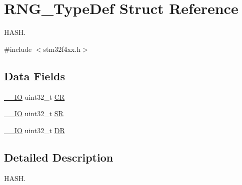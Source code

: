 \hypertarget{struct_r_n_g___type_def}{\section{R\-N\-G\-\_\-\-Type\-Def Struct Reference}
\label{struct_r_n_g___type_def}
}


H\-A\-S\-H.  




{\ttfamily \#include $<$stm32f4xx.\-h$>$}

\subsection*{Data Fields}
\begin{DoxyCompactItemize}
\item 
\hyperlink{group___c_m_s_i_s__core__definitions_gaec43007d9998a0a0e01faede4133d6be}{\-\_\-\-\_\-\-I\-O} uint32\-\_\-t \hyperlink{struct_r_n_g___type_def_ab40c89c59391aaa9d9a8ec011dd0907a}{C\-R}
\item 
\hyperlink{group___c_m_s_i_s__core__definitions_gaec43007d9998a0a0e01faede4133d6be}{\-\_\-\-\_\-\-I\-O} uint32\-\_\-t \hyperlink{struct_r_n_g___type_def_af6aca2bbd40c0fb6df7c3aebe224a360}{S\-R}
\item 
\hyperlink{group___c_m_s_i_s__core__definitions_gaec43007d9998a0a0e01faede4133d6be}{\-\_\-\-\_\-\-I\-O} uint32\-\_\-t \hyperlink{struct_r_n_g___type_def_a3df0d8dfcd1ec958659ffe21eb64fa94}{D\-R}
\end{DoxyCompactItemize}


\subsection{Detailed Description}
H\-A\-S\-H. 

